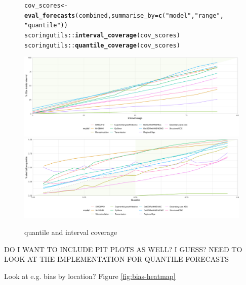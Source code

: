 \documentclass[article,shortnames]{jss}\usepackage[]{graphicx}\usepackage[]{color}
\makeatletter
\newcommand{\hlstr}[1]{\textcolor[rgb]{0.192,0.494,0.8}{#1}}%
\newcommand{\hlopt}[1]{\textcolor[rgb]{0,0,0}{#1}}%
\newcommand{\hlstd}[1]{\textcolor[rgb]{0.345,0.345,0.345}{#1}}%
\newcommand{\hlkwb}[1]{\textcolor[rgb]{0.69,0.353,0.396}{#1}}%
\newcommand{\hlkwc}[1]{\textcolor[rgb]{0.333,0.667,0.333}{#1}}%
\newcommand{\hlkwd}[1]{\textcolor[rgb]{0.737,0.353,0.396}{\textbf{#1}}}%
\newenvironment{kframe}{%
 \def\at@end@of@kframe{}%
 \ifinner\ifhmode%
  \def\at@end@of@kframe{\end{minipage}}%
  \begin{minipage}{\columnwidth}%
 \fi\fi%
 \def\FrameCommand##1{\hskip\@totalleftmargin \hskip-\fboxsep
 \colorbox{shadecolor}{##1}\hskip-\fboxsep
     \hskip-\linewidth \hskip-\@totalleftmargin \hskip\columnwidth}%
 \MakeFramed {\advance\hsize-\width
   \@totalleftmargin\z@ \linewidth\hsize
   \@setminipage}}%
 {\par\unskip\endMakeFramed%
 \at@end@of@kframe}
\newenvironment{knitrout}{}{} %
\makeatother
\begin{document}
\begin{figure}[h!]
\centering
\begin{knitrout}
\color{fgcolor}\begin{kframe}
\begin{alltt}
\hlstd{cov_scores} \hlkwb{<-} \hlkwd{eval_forecasts}\hlstd{(combined,} \hlkwc{summarise_by} \hlstd{=} \hlkwd{c}\hlstd{(}\hlstr{"model"}\hlstd{,} \hlstr{"range"}\hlstd{,}
    \hlstr{"quantile"}\hlstd{))}
\hlstd{scoringutils}\hlopt{::}\hlkwd{interval_coverage}\hlstd{(cov_scores)}
\hlstd{scoringutils}\hlopt{::}\hlkwd{quantile_coverage}\hlstd{(cov_scores)}
\end{alltt}
\end{kframe}
\includegraphics[width=0.4\linewidth]{plots/plot-coverage-1} 
\includegraphics[width=0.4\linewidth]{plots/plot-coverage-2} 
\end{knitrout}

\caption{\label{fig:coverage} quantile and interval coverage}
\end{figure}


DO I WANT TO INCLUDE PIT PLOTS AS WELL? I GUESS? NEED TO LOOK AT THE IMPLEMENTATION FOR QUANTILE FORECASTS

% 

Look at e.g. bias by location? Figure \ref{fig:bias-heatmap}
\end{document}
